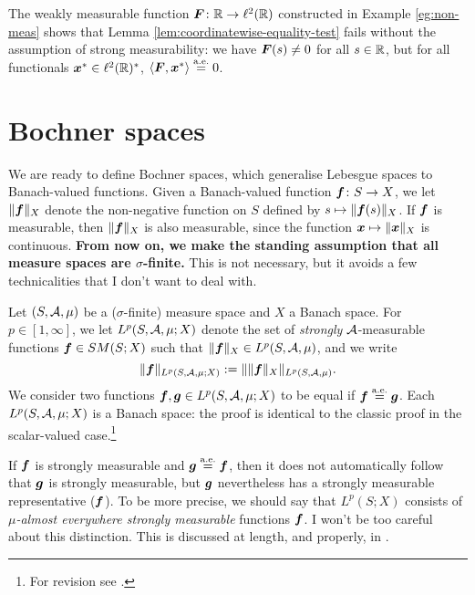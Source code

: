\begin{rmk}\label{rmk:eqtest-cex}
  The weakly measurable function $\bm{F} \colon \mathbb{R} \rightarrow \ell^2(\mathbb{R})$ constructed in Example \ref{eg:non-meas} shows that Lemma \ref{lem:coordinatewise-equality-test} fails without the assumption of strong measurability: we have $\bm{F}(s) \neq 0$ for all $s \in \mathbb{R}$, but for all functionals $\bm{x}^* \in \ell^2(\mathbb{R})^*$, $\langle \bm{F} , \bm{x}^{*} \rangle \stackrel{\mathrm{a.e.}}{=} 0$.
\end{rmk}

\section{Bochner spaces}

We are ready to define Bochner spaces, which generalise Lebesgue spaces to Banach-valued functions.
Given a Banach-valued function $\bm{f} \colon S \rightarrow X$, we let $\|\bm{f}\|_X$ denote the non-negative function on $S$ defined by $s \mapsto \|\bm{f}(s)\|_X$.
If $\bm{f}$ is measurable, then $\|\bm{f}\|_X$ is also measurable, since the function $\bm{x} \mapsto \|\bm{x}\|_X$ is continuous.
\textbf{From now on, we make the standing assumption that all measure spaces are $\sigma$-finite.} This is not necessary, but it avoids a few technicalities that I don't want to deal with.

\begin{defn}
  Let $(S,\mathcal{A},\mu)$ be a ($\sigma$-finite) measure space and $X$ a Banach space.
  For $p \in [1,\infty]$, we let $L^p(S,\mathcal{A},\mu;X)$ denote the set of \emph{strongly} $\mathcal{A}$-measurable functions $\bm{f} \in SM(S;X)$ such that $\|\bm{f}\|_X \in L^p(S,\mathcal{A},\mu)$, and we write
  \begin{equation*}
    \|\bm{f}\|_{L^p(S,\mathcal{A},\mu;X)} := \| \|\bm{f}\|_X \|_{L^p(S,\mathcal{A},\mu)}.
  \end{equation*}
  We consider two functions $\bm{f}, \bm{g} \in L^p(S,\mathcal{A},\mu;X)$ to be equal if $\bm{f} \stackrel{\mathrm{a.e.}}{=} \bm{g}$.
  Each $L^p(S,\mathcal{A},\mu;X)$ is a Banach space: the proof is identical to the classic proof in the scalar-valued case.\footnote{For revision see \cite[Theorem 5.2.1]{rD04}.}
\end{defn}

\begin{rmk}
  If $\bm{f}$ is strongly measurable and $\bm{g} \stackrel{\mathrm{a.e.}}{=} \bm{f}$, then it does not automatically follow that $\bm{g}$ is strongly measurable, but $\bm{g}$ nevertheless has a strongly measurable representative ($\bm{f}$).
  To be more precise, we should say that $L^p(S;X)$ consists of \emph{$\mu$-almost everywhere strongly measurable} functions $\bm{f}$.
  I won't be too careful about this distinction.
  This is discussed at length, and properly, in \cite[Section 1.1.b]{HNVW16}.
\end{rmk}

